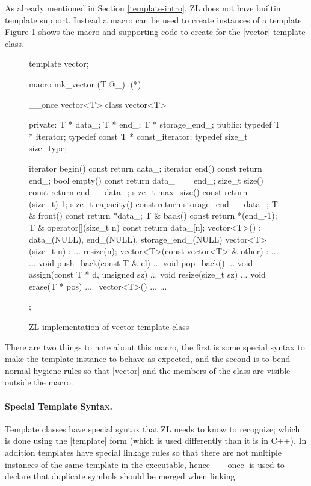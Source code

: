 As already mentioned in Section \ref{template-intro}, ZL does not have builtin
template support.  Instead a macro can be used to create instances of
a template.  Figure \ref{vector-impl} shows the macro and supporting
code to create for the |vector| template class.
\begin{figure}
\begin{codef}
template vector;

macro mk_vector (T,@_) :(*)
{
  __once vector<T>
  class vector<T> {
  private:
    T * data_;
    T * end_;
    T * storage_end_;
  public:
    typedef T * iterator;
    typedef const T * const_iterator;
    typedef size_t size_type;

    iterator begin() const {return data_;}
    iterator end()   const {return end_;}
    bool empty() const {return data_ == end_;}
    size_t size() const {return end_ - data_;}
    size_t max_size() const {return (size_t)-1;}
    size_t capacity() const {return storage_end_ - data_;}
    T & front() const {return *data_;}
    T & back() const {return *(end_-1);}
    T & operator[](size_t n) const {return data_[n];}
    vector<T>() : data_(NULL), end_(NULL), storage_end_(NULL) {}
    vector<T>(size_t n) : ... {resize(n);}
    vector<T>(const vector<T> & other) : ... {...}
    void push_back(const T & el) {...}
    void pop_back() {...}
    void assign(const T * d, unsigned sz) {...}
    void resize(size_t sz) {...}
    void erase(T * pos) {...}
    ~vector<T>() {...}
    ...
  };
}
\end{codef}
\caption{ZL implementation of vector template class}
\label{vector-impl}
\end{figure}

There are two things to note about this macro, the first is some
special syntax to make the template instance to behave as expected,
and the second is to bend normal hygiene rules so that |vector| and the
members of the class are visible outside the macro.

\paragraph{Special Template Syntax.}

Template classes have special syntax that ZL needs to know to
recognize; which is done using the |template| form (which is used
differently than it is in C++).  In addition templates have special
linkage rules so that there are not multiple instances of the same
template in the executable, hence |__once| is used to declare that
duplicate symbols should be merged when linking.

